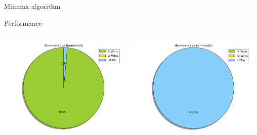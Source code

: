 \documentclass{beamer}
\begin{document}
\begin{frame}{Minmax algorithm}
	
\lstMinMax
\end{frame}

\begin{frame}{Performance}
	 \begin{columns}
	 	\begin{column}{0.5\textwidth}
	 		\centering
	 		\includegraphics[scale =0.30]{minmax_random.png}
	 	\end{column}
	 	\begin{column}{0.5\textwidth}
	 		\centering
	 		\includegraphics[scale =0.30]{minmax_minmax.png}
	 	\end{column}
	 \end{columns}
\end{frame}
\end{document}
